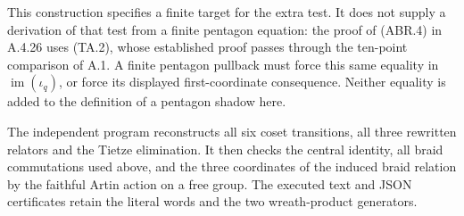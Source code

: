 This construction specifies a finite target for the extra test.
It does not supply a derivation of that test from a finite
pentagon equation: the proof of (ABR.4) in A.4.26 uses (TA.2),
whose established proof passes through the ten-point comparison
of A.1.  A finite pentagon pullback must force this same equality
in $\operatorname{im}(\iota_q)$, or force its displayed
first-coordinate consequence.  Neither equality is added to
the definition of a pentagon shadow here.

The independent program
 reconstructs
all six coset transitions, all three rewritten relators and
the Tietze elimination.  It then checks the central identity,
all braid commutations used above, and the three coordinates of
the induced braid relation by the faithful Artin action on a
free group.  The executed text and JSON certificates retain
the literal words and the two wreath-product generators.

